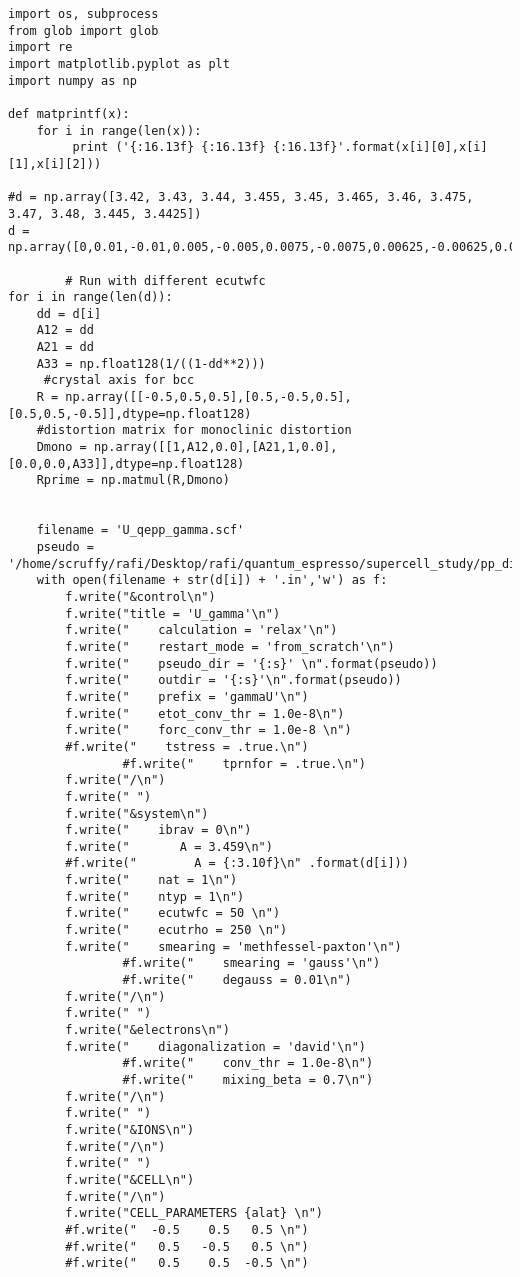 \newpage
\lstset{style=pythn}
\begin{lstlisting}
import os, subprocess
from glob import glob
import re
import matplotlib.pyplot as plt 
import numpy as np

def matprintf(x):
    for i in range(len(x)):
         print ('{:16.13f} {:16.13f} {:16.13f}'.format(x[i][0],x[i][1],x[i][2]))

#d = np.array([3.42, 3.43, 3.44, 3.455, 3.45, 3.465, 3.46, 3.475, 3.47, 3.48, 3.445, 3.4425])
d = np.array([0,0.01,-0.01,0.005,-0.005,0.0075,-0.0075,0.00625,-0.00625,0.0025,-0.0025,0.00375,-0.00375,0.00125,-0.00125,0.02,-0.02])
    
        # Run with different ecutwfc
for i in range(len(d)):
    dd = d[i]
    A12 = dd
    A21 = dd
    A33 = np.float128(1/((1-dd**2)))
     #crystal axis for bcc
    R = np.array([[-0.5,0.5,0.5],[0.5,-0.5,0.5],[0.5,0.5,-0.5]],dtype=np.float128)
    #distortion matrix for monoclinic distortion
    Dmono = np.array([[1,A12,0.0],[A21,1,0.0],[0.0,0.0,A33]],dtype=np.float128)
    Rprime = np.matmul(R,Dmono)


    filename = 'U_qepp_gamma.scf' 
    pseudo = '/home/scruffy/rafi/Desktop/rafi/quantum_espresso/supercell_study/pp_dir'
    with open(filename + str(d[i]) + '.in','w') as f:
        f.write("&control\n")
        f.write("title = 'U_gamma'\n")
        f.write("    calculation = 'relax'\n")
        f.write("    restart_mode = 'from_scratch'\n")
        f.write("    pseudo_dir = '{:s}' \n".format(pseudo))
        f.write("    outdir = '{:s}'\n".format(pseudo))
        f.write("    prefix = 'gammaU'\n")
        f.write("    etot_conv_thr = 1.0e-8\n")
        f.write("    forc_conv_thr = 1.0e-8 \n")
        #f.write("    tstress = .true.\n")
                #f.write("    tprnfor = .true.\n")
        f.write("/\n")
        f.write(" ")
        f.write("&system\n")
        f.write("    ibrav = 0\n")
        f.write("       A = 3.459\n")
        #f.write("        A = {:3.10f}\n" .format(d[i]))
        f.write("    nat = 1\n")
        f.write("    ntyp = 1\n")
        f.write("    ecutwfc = 50 \n")
        f.write("    ecutrho = 250 \n")
        f.write("    smearing = 'methfessel-paxton'\n")
                #f.write("    smearing = 'gauss'\n")
                #f.write("    degauss = 0.01\n")
        f.write("/\n")
        f.write(" ")
        f.write("&electrons\n")
        f.write("    diagonalization = 'david'\n")
                #f.write("    conv_thr = 1.0e-8\n")
                #f.write("    mixing_beta = 0.7\n")
        f.write("/\n")
        f.write(" ")
        f.write("&IONS\n")
        f.write("/\n")
        f.write(" ")
        f.write("&CELL\n")
        f.write("/\n")
        f.write("CELL_PARAMETERS {alat} \n")
        #f.write("  -0.5    0.5   0.5 \n")
        #f.write("   0.5   -0.5   0.5 \n")
        #f.write("   0.5    0.5  -0.5 \n")
    

\end{lstlisting}
